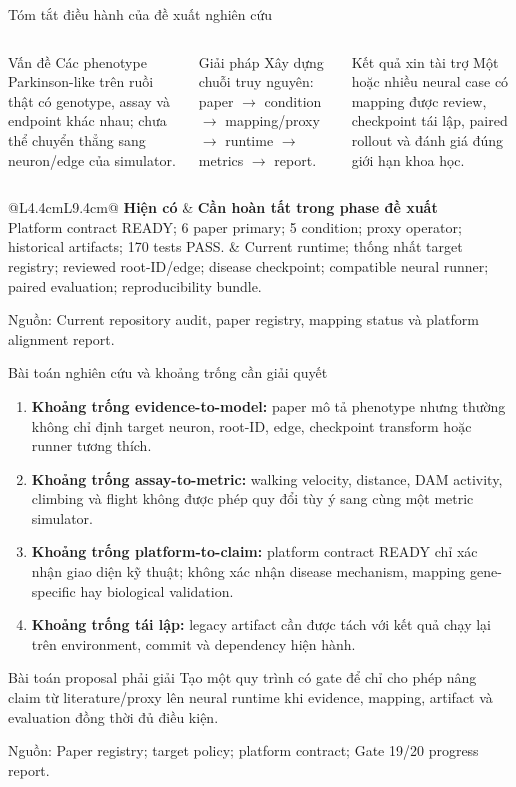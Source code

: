 \documentclass[10pt,aspectratio=169]{beamer}
\newcommand{\kw}[1]{\textcolor{uitblue}{\textbf{#1}}}
\newcommand{\source}[1]{\par\vfill{\fontsize{6.0}{7}\selectfont\color{gray}Nguồn: #1\par}}
\newcommand{\smallgap}{\vspace{0.18cm}}
\begin{document}
\begin{frame}{Tóm tắt điều hành của đề xuất nghiên cứu}
\begin{columns}[T,onlytextwidth]
\begin{block}{Vấn đề}
Các phenotype Parkinson-like trên ruồi thật có genotype, assay và endpoint khác nhau; chưa thể chuyển thẳng sang neuron/edge của simulator.
\end{block}
\begin{block}{Giải pháp}
Xây dựng chuỗi truy nguyên: paper $\rightarrow$ condition $\rightarrow$ mapping/proxy $\rightarrow$ runtime $\rightarrow$ metrics $\rightarrow$ report.
\end{block}
\begin{block}{Kết quả xin tài trợ}
Một hoặc nhiều neural case có mapping được review, checkpoint tái lập, paired rollout và đánh giá đúng giới hạn khoa học.
\end{block}
\end{columns}
\smallgap
\begin{tabular}{@{}L{4.4cm}L{9.4cm}@{}}
\toprule
\textbf{Hiện có} & \textbf{Cần hoàn tất trong phase đề xuất}\\\midrule
Platform contract READY; 6 paper primary; 5 condition; proxy operator; historical artifacts; 170 tests PASS. & Current runtime; thống nhất target registry; reviewed root-ID/edge; disease checkpoint; compatible neural runner; paired evaluation; reproducibility bundle.\\\bottomrule
\end{tabular}
\source{Current repository audit, paper registry, mapping status và platform alignment report.}
\end{frame}

\begin{frame}{Bài toán nghiên cứu và khoảng trống cần giải quyết}
\begin{enumerate}\setlength\itemsep{8pt}
\item \kw{Khoảng trống evidence-to-model:} paper mô tả phenotype nhưng thường không chỉ định target neuron, root-ID, edge, checkpoint transform hoặc runner tương thích.
\item \kw{Khoảng trống assay-to-metric:} walking velocity, distance, DAM activity, climbing và flight không được phép quy đổi tùy ý sang cùng một metric simulator.
\item \kw{Khoảng trống platform-to-claim:} platform contract READY chỉ xác nhận giao diện kỹ thuật; không xác nhận disease mechanism, mapping gene-specific hay biological validation.
\item \kw{Khoảng trống tái lập:} legacy artifact cần được tách với kết quả chạy lại trên environment, commit và dependency hiện hành.
\end{enumerate}
\begin{block}{Bài toán proposal phải giải}
Tạo một quy trình có gate để chỉ cho phép nâng claim từ literature/proxy lên neural runtime khi evidence, mapping, artifact và evaluation đồng thời đủ điều kiện.
\end{block}
\source{Paper registry; target policy; platform contract; Gate 19/20 progress report.}
\end{frame}
\end{document}
